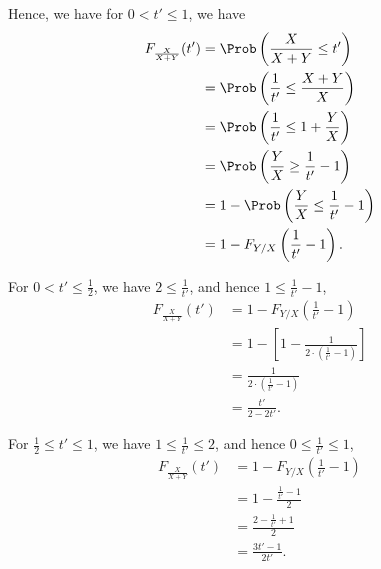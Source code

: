 \begin{enumerate}
          Hence, we have for \(0 < t' \leq 1\), we have
          \begin{align*}
              F_{\frac{X}{X + Y}}(t') & = \Prob\left(\frac{X}{X + Y} \leq t'\right)               \\
                                      & = \Prob\left(\frac{1}{t'} \leq \frac{X + Y}{X}\right)     \\
                                      & = \Prob\left(\frac{1}{t'} \leq 1 + \frac{Y}{X}\right)     \\
                                      & = \Prob\left(\frac{Y}{X} \geq \frac{1}{t'} - 1\right)     \\
                                      & = 1 - \Prob\left(\frac{Y}{X} \leq \frac{1}{t'} - 1\right) \\
                                      & = 1 - F_{Y / X} \left(\frac{1}{t'} - 1\right).
          \end{align*}

          For \(0 < t' \leq \frac{1}{2}\), we have \(2 \leq \frac{1}{t'}\), and hence \(1 \leq \frac{1}{t'} - 1\),
          \begin{align*}
              F_{\frac{X}{X + Y}}(t') & = 1 - F_{Y / X} \left(\frac{1}{t'} - 1\right)                          \\
                                      & = 1 - \left[1 - \frac{1}{2 \cdot \left(\frac{1}{t'} - 1\right)}\right] \\
                                      & = \frac{1}{2 \cdot \left(\frac{1}{t'} - 1\right)}                      \\
                                      & = \frac{t'}{2 - 2t'}.
          \end{align*}

          For \(\frac{1}{2} \leq t' \leq 1\), we have \(1 \leq \frac{1}{t'} \leq 2\), and hence \(0 \leq \frac{1}{t'} \leq 1\),
          \begin{align*}
              F_{\frac{X}{X + Y}}(t') & = 1 - F_{Y / X} \left(\frac{1}{t'} - 1\right) \\
                                      & = 1 - \frac{\frac{1}{t'} - 1}{2}              \\
                                      & = \frac{2 - \frac{1}{t'} + 1}{2}              \\
                                      & = \frac{3t' - 1}{2t'}.
          \end{align*}


\end{enumerate}
